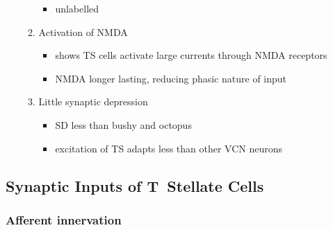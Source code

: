 \begin{enumerate}
\begin{enumerate}
\begin{itemize}
\item unlabelled \citep{RothmanManis:2003,RothmanManis:2003a,RothmanManis:2003b,Rothman:1999}
\end{itemize}
\item Activation of NMDA
\begin{itemize}
\item \citep{CaoOertel:2010} shows TS cells activate large currents through NMDA receptors
\item NMDA longer lasting, reducing phasic nature of input
\end{itemize}
\item Little synaptic depression
\begin{itemize}
\item SD less than bushy and octopus \citep{WuOertel:1987,ChandaXu-Friedman:2010,CaoOertel:2010}
\item excitation of TS adapts less than other VCN neurons
\end{itemize}
\end{enumerate}
\end{enumerate}



\subsection{Synaptic Inputs of T~Stellate Cells}\label{sec:synaptic-inputs-tstellate}


 \subsubsection{Afferent innervation}

